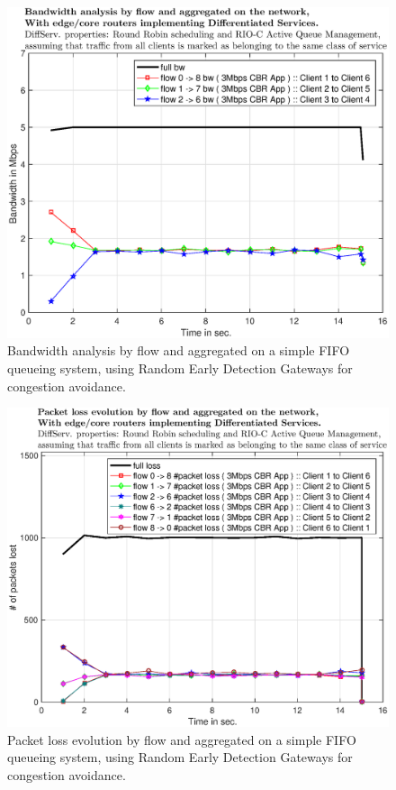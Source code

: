 \documentclass[conference,compsoc]{IEEEtran}
\begin{document}
\begin{figure}[H]
     \centering
     \includegraphics[width=1\columnwidth]{EPS/C/bw_c4.eps}
     \caption{Bandwidth analysis by flow and aggregated on a simple FIFO queueing system, using Random Early Detection Gateways for congestion avoidance.}
     \label{graph:bw_c4}
     \end{figure}


     \begin{figure}[H]
     \centering
     \includegraphics[width=1\columnwidth]{EPS/C/loss_c4.eps}
     \caption{Packet loss evolution by flow and aggregated on a simple FIFO queueing system, using Random Early Detection Gateways for congestion avoidance.}
     \label{graph:loss_c4}
     \end{figure}
\end{document}
